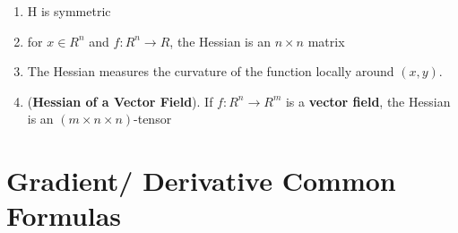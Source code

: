 \begin{enumerate}
    \item H is symmetric

    \item for $x \in R^n$ and $f : R^n \to R$, the Hessian is an $n \times n$ matrix

    \item The Hessian measures the curvature of the function locally around $(x, y)$.

    \item (\textbf{Hessian of a Vector Field}). If $f : R^n \to R^m$ is a \textbf{vector field}, the Hessian is an $(m \times n \times n)$-tensor
\end{enumerate}



\section{Gradient/ Derivative Common Formulas}\label{matrix-vector: Gradient/ Derivative Common Formulas}

